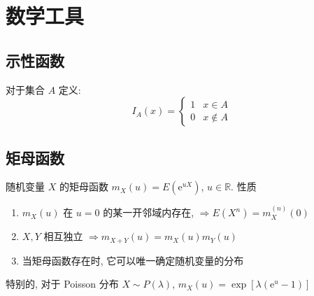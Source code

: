 \documentclass[11pt,a4paper,twocolumn]{article} %
\numberwithin{equation}{section} %
\newcommand\e{\mathrm{e}} %
\begin{document}
\section{数学工具} %
\label{sec:tools}
\subsection{示性函数} %
\label{sub:indicator}
对于集合 $A$ 定义:
\begin{equation}
	I_A(x) = \begin{cases}
		1 & x\in A \\
		0 & x\notin A
	\end{cases}
\end{equation}
\subsection{矩母函数} %
\label{sub:moment_gen_func}
随机变量 $X$ 的矩母函数 $m_X(u) = E(\e^{uX})$, $u\in \mathbb R$. 性质
\begin{enumerate}
	\item $m_X(u)$ 在 $u = 0$ 的某一开邻域内存在, 
	$\Rightarrow E(X^n) = m_X^{(n)}(0)$
	\item $X, Y$ 相互独立 $\Rightarrow m_{X+Y}(u) = m_X(u)m_Y(u)$
	\item 当矩母函数存在时, 它可以唯一确定随机变量的分布
\end{enumerate}

特别的, 对于 Poisson 分布 $X\sim P(\lambda)$, $m_X(u) = \exp[\lambda(\e^u - 1)]$
\end{document}
